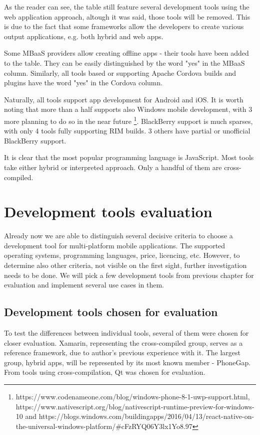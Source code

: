 \documentclass[english,master,public,dept460,male,cpdeclaration,oneside]{diploma}
\begin{document}
As the reader can see, the table still feature several development tools using the web application approach, altough it was said, those tools will be removed. This is due to the fact that some frameworks allow the developers to create various output applications, e.g. both hybrid and web apps.

Some MBaaS providers allow creating offline apps - their tools have been added to the table. They can be easily distinguished by the word "yes" in the MBaaS column. Similarly, all tools based or supporting Apache Cordova builds and plugins have the word "yes" in the Cordova column.

Naturally, all tools support app development for Android and iOS. It is worth noting that more than a half supports also Windows mobile development, with 3 more planning to do so in the near future \footnote{https://www.codenameone.com/blog/windows-phone-8-1-uwp-support.html, https://www.nativescript.org/blog/nativescript-runtime-preview-for-windows-10 and https://blogs.windows.com/buildingapps/2016/04/13/react-native-on-the-universal-windows-platform/\#cFzRYQ06Y3lx1Yo8.97}. BlackBerry support is much sparses, with only 4 tools fully supporting RIM builds. 3 others have partial or unofficial BlackBerry support.

It is clear that the most popular programming language is JavaScript. Most tools take either hybrid or interpreted approach. Only a handful of them are cross-compiled.



\section{Development tools evaluation}
Already now we are able to distinguish several decisive criteria to choose a development tool for multi-platform mobile applications. The supported operating systems, programming languages, price, licencing, etc. However, to determine also other criteria, not visible on the first sight, further investigation needs to be done. We will pick a few development tools from previous chapter for evaluation and implement several use cases in them.

\subsection{Development tools chosen for evaluation}
To test the differences between individual tools, several of them were chosen for closer evaluation. Xamarin, representing the cross-compiled group, serves as a reference framework, due to author’s previous experience with it. The largest group, hybrid apps, will be represented by its most known member - PhoneGap. From tools using cross-compilation, Qt was chosen for evaluation.
\end{document}
